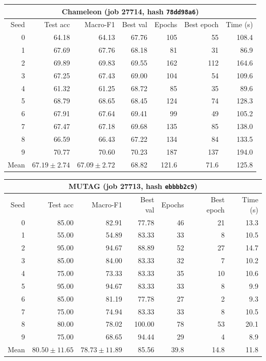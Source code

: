 \documentclass[11pt,a4paper]{article}
\begin{document}
\begin{table}[!htbp]
\centering
\begin{tabular}{rrrrrrr}
\toprule
\multicolumn{7}{c}{\textbf{Chameleon} (job 27714, hash \texttt{78dd98a6})} \\
\midrule
Seed & Test acc & Macro-F1 & Best val & Epochs & Best epoch & Time (s) \\
\midrule
0 & 64.18 & 64.13 & 67.76 & 105 & 55 & 108.4 \\
1 & 67.69 & 67.76 & 68.18 & 81 & 31 & 86.9 \\
2 & 69.89 & 69.83 & 69.55 & 162 & 112 & 164.6 \\
3 & 67.25 & 67.43 & 69.00 & 104 & 54 & 109.6 \\
4 & 61.32 & 61.25 & 68.72 & 85 & 35 & 89.6 \\
5 & 68.79 & 68.65 & 68.45 & 124 & 74 & 128.3 \\
6 & 67.91 & 67.64 & 69.41 & 99 & 49 & 105.2 \\
7 & 67.47 & 67.18 & 69.68 & 135 & 85 & 138.0 \\
8 & 66.59 & 66.43 & 67.22 & 134 & 84 & 133.5 \\
9 & 70.77 & 70.60 & 70.23 & 187 & 137 & 194.0 \\
\midrule
Mean & $67.19 \pm 2.74$ & $67.09 \pm 2.72$ & 68.82 & 121.6 & 71.6 & 125.8 \\
\bottomrule
\end{tabular}
\end{table}

\begin{table}[!htbp]
\centering
\begin{tabular}{rrrrrrr}
\toprule
\multicolumn{7}{c}{\textbf{MUTAG} (job 27713, hash \texttt{ebbbb2c9})} \\
\midrule
Seed & Test acc & Macro-F1 & Best val & Epochs & Best epoch & Time (s) \\
\midrule
0 & 85.00 & 82.91 & 77.78 & 46 & 21 & 13.3 \\
1 & 55.00 & 54.89 & 83.33 & 33 & 8 & 10.5 \\
2 & 95.00 & 94.67 & 88.89 & 52 & 27 & 14.7 \\
3 & 85.00 & 84.00 & 83.33 & 32 & 7 & 10.2 \\
4 & 75.00 & 73.33 & 83.33 & 35 & 10 & 10.6 \\
5 & 95.00 & 94.67 & 83.33 & 33 & 8 & 9.9 \\
6 & 85.00 & 81.19 & 77.78 & 27 & 2 & 9.3 \\
7 & 75.00 & 74.94 & 83.33 & 33 & 8 & 10.5 \\
8 & 80.00 & 78.02 & 100.00 & 78 & 53 & 20.1 \\
9 & 75.00 & 68.65 & 94.44 & 29 & 4 & 8.9 \\
\midrule
Mean & $80.50 \pm 11.65$ & $78.73 \pm 11.89$ & 85.56 & 39.8 & 14.8 & 11.8 \\
\bottomrule
\end{tabular}
\end{table}
\end{document}
